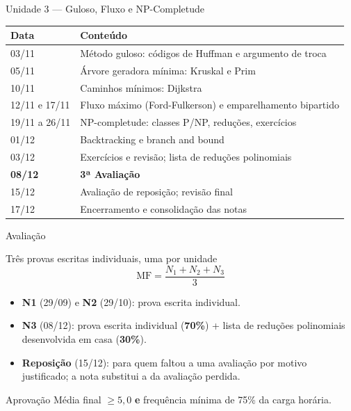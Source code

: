 \documentclass[aspectratio=169]{beamer}
\begin{document}
\begin{frame}[shrink]{Unidade 3 --- Guloso, Fluxo e NP-Completude}
  \begin{center}
  \renewcommand{\arraystretch}{1.2}
  \small
  \begin{tabular}{ll}
    \toprule
    \textbf{Data} & \textbf{Conteúdo} \\
    \midrule
    03/11 & Método guloso: códigos de Huffman e argumento de troca \\
    05/11 & Árvore geradora mínima: Kruskal e Prim \\
    10/11 & Caminhos mínimos: Dijkstra \\
    12/11 e 17/11 & Fluxo máximo (Ford-Fulkerson) e emparelhamento bipartido \\
    19/11 a 26/11 & NP-completude: classes P/NP, reduções, exercícios \\
    01/12 & Backtracking e branch and bound \\
    03/12 & Exercícios e revisão; lista de reduções polinomiais \\
    \textbf{08/12} & \textbf{3ª Avaliação} \\
    15/12 & Avaliação de reposição; revisão final \\
    17/12 & Encerramento e consolidação das notas \\
    \bottomrule
  \end{tabular}
  \end{center}
\end{frame}

\begin{frame}{Avaliação}
  \begin{block}{Três provas escritas individuais, uma por unidade}
    \[
      \text{MF} = \frac{N_1 + N_2 + N_3}{3}
    \]
  \end{block}

  \begin{itemize}
    \item \textbf{N1} (29/09) e \textbf{N2} (29/10): prova escrita individual.
    \item \textbf{N3} (08/12): prova escrita individual (\textbf{70\%}) + lista de
      reduções polinomiais desenvolvida em casa (\textbf{30\%}).
    \item \textbf{Reposição} (15/12): para quem faltou a uma avaliação por motivo
      justificado; a nota substitui a da avaliação perdida.
  \end{itemize}

  \begin{alertblock}{Aprovação}
    Média final $\ge 5{,}0$ \textbf{e} frequência mínima de 75\% da carga horária.
  \end{alertblock}
\end{frame}
\end{document}
